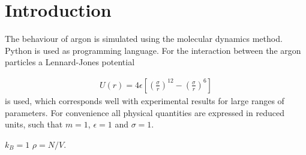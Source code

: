 \section{Introduction}
The behaviour of argon is simulated using the molecular dynamics method. Python is used as programming language. For the interaction between the argon particles a Lennard-Jones potential

\begin{gather}
U(r) = 4\epsilon \left[\left(\frac{\sigma}{r}\right)^12-\left(\frac{\sigma}{r}\right)^6\right]
\end{gather}
is used, which corresponds well with experimental results for large ranges of parameters\cite{LJpotentialArgonverification}. For convenience all physical quantities are expressed in reduced units, such that $m=1$, $\epsilon = 1$ and $\sigma = 1$. 



$k_B=1$ $\rho=N/V$.